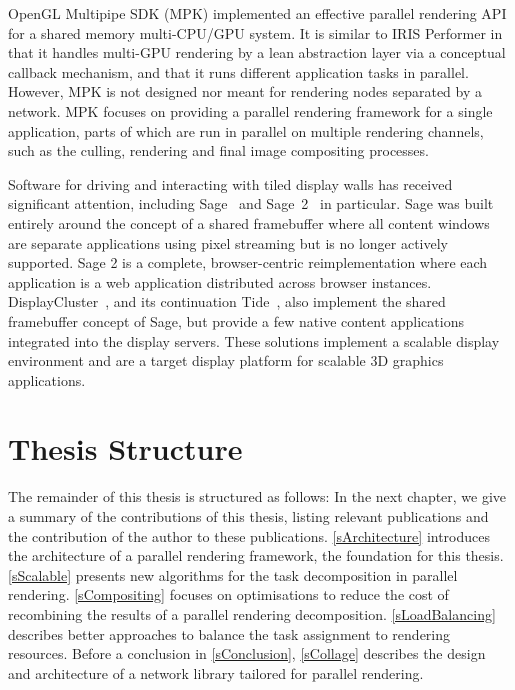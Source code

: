 OpenGL Multipipe SDK (MPK) \cite{BRE:05} implemented an effective parallel
rendering API for a shared memory multi-CPU/GPU system. It is similar to IRIS
Performer \cite{RH:94} in that it handles multi-GPU rendering by a lean
abstraction layer via a conceptual callback mechanism, and that it runs
different application tasks in parallel. However, MPK is not designed nor meant
for rendering nodes separated by a network. MPK focuses on providing a parallel
rendering framework for a single application, parts of which are run in parallel
on multiple rendering channels, such as the culling, rendering and final image
compositing processes.

Software for driving and interacting with tiled display walls has received
significant attention, including {Sage}~\cite{Sage} and
 {Sage~2}~\cite{Sage2} in particular. {Sage} was built entirely
around the concept of a shared framebuffer where all content windows are
separate applications using pixel streaming but is no longer actively supported.
{Sage 2} is a complete, browser-centric reimplementation where each
application is a web application distributed across browser instances.
{DisplayCluster}~\cite{DisplayCluster}, and its continuation
 {Tide}~\cite{tide}, also implement the shared framebuffer concept of
 {Sage}, but provide a few native content applications integrated into the
display servers. These solutions implement a scalable display environment and
are a target display platform for scalable 3D graphics applications.

\section{Thesis Structure}

The remainder of this thesis is structured as follows: In the next chapter, we
give a summary of the contributions of this thesis, listing relevant
publications and the contribution of the author to these publications.
\cref{sArchitecture} introduces the architecture of a parallel rendering
framework, the foundation for this thesis. \cref{sScalable} presents new
algorithms for the task decomposition in parallel rendering. \cref{sCompositing}
focuses on optimisations to reduce the cost of recombining the results of a
parallel rendering decomposition. \cref{sLoadBalancing} describes better
approaches to balance the task assignment to rendering resources. Before a
conclusion in \cref{sConclusion}, \cref{sCollage} describes the design and
architecture of a network library tailored for parallel rendering.


